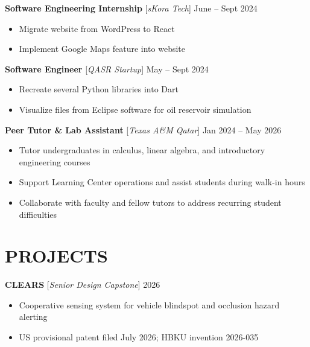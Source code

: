 \documentclass[11pt,a4paper]{article}
\begin{document}
\vspace{2pt}

\textbf{Software Engineering Internship} [\textit{sKora Tech}] \hfill June -- Sept 2024
\begin{itemize}[leftmargin=2em, nosep, label={}]
    \item Migrate website from WordPress to React
    \item Implement Google Maps feature into website
\end{itemize}

\vspace{2pt}

\textbf{Software Engineer} [\textit{QASR Startup}] \hfill May -- Sept 2024
\begin{itemize}[leftmargin=2em, nosep, label={}]
    \item Recreate several Python libraries into Dart
    \item Visualize files from Eclipse software for oil reservoir simulation
\end{itemize}

\vspace{2pt}

\textbf{Peer Tutor \& Lab Assistant} [\textit{Texas A\&M Qatar}] \hfill Jan 2024 -- May 2026
\begin{itemize}[leftmargin=2em, nosep, label={}]
    \item Tutor undergraduates in calculus, linear algebra, and introductory engineering courses
    \item Support Learning Center operations and assist students during walk-in hours
    \item Collaborate with faculty and fellow tutors to address recurring student difficulties
\end{itemize}


\newpage

\section*{PROJECTS}

\textbf{CLEARS} [\textit{Senior Design Capstone}] \hfill 2026
\begin{itemize}[leftmargin=2em, nosep, label={}]
    \item Cooperative sensing system for vehicle blindspot and occlusion hazard alerting
    \item US provisional patent filed July 2026; HBKU invention 2026-035
\end{itemize}
\end{document}
